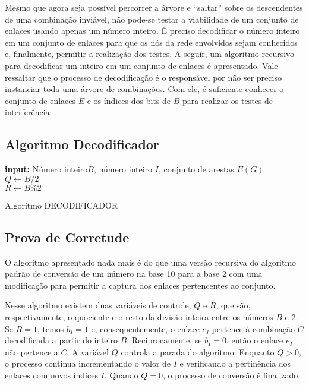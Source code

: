 Mesmo que agora seja possível percorrer a árvore e “saltar” sobre os descendentes de uma combinação inviável, não pode-se testar a viabilidade de um conjunto de enlaces usando apenas um número inteiro. É preciso decodificar o número inteiro em um conjunto de enlaces para que os nós da rede envolvidos sejam conhecidos e, finalmente, permitir a realização dos testes. A seguir, um algoritmo recursivo para decodificar um inteiro em um conjunto de enlaces é apresentado. Vale ressaltar que o processo de decodificação é o responsável por não ser preciso instanciar toda uma árvore de combinações. Com ele, é suficiente conhecer o conjunto de enlaces $E$ e os índices dos bits de $B$ para realizar os testes de interferência.

\subsection{Algoritmo Decodificador}

\begin{algorithm}[h]
	\SetVline
	{\bf input:} Número inteiro$B$, número inteiro $I$, conjunto de arestas $E(G)$\\
	$Q \leftarrow B/2$\\
	$R \leftarrow B\%2$\\
\caption{Algoritmo DECODIFICADOR}
\label{alg:decodificador}
\end{algorithm}

\subsection{Prova de Corretude}

O algoritmo apresentado nada mais é do que uma versão recursiva do algoritmo padrão de conversão de um número na base 10 para a base 2 com uma modificação para permitir a captura dos enlaces pertencentes ao conjunto.

Nesse algoritmo existem duas variáveis de controle, $Q$ e $R$, que são, respectivamente, o quociente e o resto da divisão inteira entre os números $B$ e 2. Se $R=1$, temos $b_I=1$ e, consequentemente, o enlace $e_I$ pertence à combinação $C$ decodificada a partir do inteiro $B$. Reciprocamente, se $b_I=0$, então o enlace $e_I$ não pertence a $C$. A variável $Q$ controla a parada do algoritmo. Enquanto $Q>0$, o processo continua incrementando o valor de $I$ e verificando a pertinência dos enlaces com novos índices $I$. Quando $Q=0$, o processo de conversão é finalizado.

